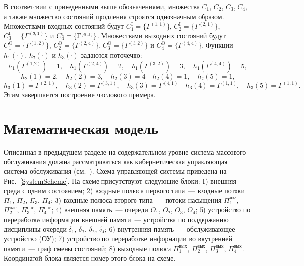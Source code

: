 \documentclass[12pt]{extarticle}
\theoremstyle{theorem}
\theoremstyle{remark}
\renewcommand*{\hm}[1]{#1\nobreak\discretionary{}%
	{\hbox{$\mathsurround=0pt #1$}}{}}%
\begin{document}
В соответсвии с приведенными выше обозначениями, множества $C_1$, $C_2$, $C_3$, $C_4$, а также множество состояний продления строятся однозначным образом. Множествами входных состояний будут $C_1^{\mathrm{I}}=\{\Gamma^{(1,1)}\}$, $C_2^{\mathrm{I}}=\{\Gamma^{(2,1)}\}$, $C_3^{\mathrm{I}}=\{\Gamma^{(3,1)}\}$ и $C_4^{\mathrm{I}}\hm=\{\Gamma^{(4,1)}\}$. Множествами выходных состояний будут $C_1^{\mathrm{O}}=\{\Gamma^{(1,2)}\}$, $C_2^{\mathrm{O}}=\{\Gamma^{(2,4)}\}$, $C_3^{\mathrm{O}}=\{\Gamma^{(3,2)}\}$ и $C_4^{\mathrm{O}}=\{\Gamma^{(4,4)}\}$. Функции $h_1(\cdot)$, $h_2(\cdot)$ и $h_3(\cdot)$ задаются поточечно:
\begin{equation*}
h_1(\Gamma^{(1,2)})=1, \quad h_1(\Gamma^{(2,4)})=2, \quad h_1(\Gamma^{(3,2)})=3, \quad h_1(\Gamma^{(4,4)})=5,
\end{equation*}
\begin{equation*}
h_2(1)=2, \quad h_2(2)=3, \quad h_2(3)=4 \quad h_2(4)=1, \quad h_2(5)=1,
\end{equation*}
\begin{equation*}
h_3(1)=\Gamma^{(2,1)}, \quad h_3(2)=\Gamma^{(3,1)}, \quad h_3(3)=\Gamma^{(4,1)} \quad h_3(4)=\Gamma^{(1,1)}, \quad h_3(5)=\Gamma^{(1,1)}.
\end{equation*}
Этим завершается построение числового примера.


\section{Математическая модель}

Описанная в предыдущем разделе на содержательном уровне система массового обслуживания должна рассматриваться как кибернетическая управляющая система обслуживания (см.~\cite{Yablonski}). Схема управляющей системы приведена на Рис.~\ref{SystemScheme}. На схеме присутствуют следующие блоки: 1) внешняя среда с одним состоянием; 2) входные полюса первого типа~--- входные потоки $\Pi_1$, $\Pi_2$, $\Pi_3$, $\Pi_4$; 3) входные полюса второго типа~--- потоки насыщения $\Pi_1^{\mathrm{\text{нас}}}$, $\Pi_2^{\mathrm{\text{нас}}}$, $\Pi_3^{\mathrm{\text{нас}}}$, $\Pi_4^{\mathrm{\text{нас}}}$; 4) внешняя память~--- очереди $O_1$, $O_2$, $O_3$, $O_4$; 5) устройство по переработкe информации внешней памяти~--- устройства по поддержанию дисциплины очереди $\delta_1$, $\delta_2$, $\delta_3$, $\delta_4$; 6) внутренняя память~--- обслуживающее устройство (ОУ); 7) устройство по переработке информации во внутренней памяти~--- граф смены состояний; 8) выходные полюса $\Pi_1^{\mathrm{\text{вых}}}$, $\Pi_2^{\mathrm{\text{вых}}}$, $\Pi_3^{\mathrm{\text{вых}}}$, $\Pi_4^{\mathrm{\text{вых}}}$. Координатой блока является номер этого блока на схеме. 
\end{document}
